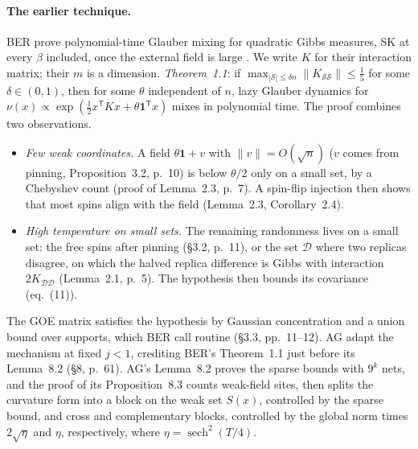 \documentclass[11pt]{article}
\newcommand{\one}{\mathbf{1}}
\newcommand{\norm}[1]{\lVert #1\rVert}
\newcommand{\ploc}[2]{#1}
\newcommand{\sloc}[2]{\cite[#2]{#1}}
\begin{document}
\paragraph{The earlier technique.}
BER prove polynomial-time Glauber mixing for quadratic Gibbs measures, SK at
every $\beta$ included, once the external field is large
\sloc{BandeiraElAlaouiRodder2026-GlauberHighOverlapGibbs}{\S1.1, Thm.~1.1 and Cor.~1.2, p.~3}.
We write $K$ for their interaction matrix; their $m$ is a dimension.
\emph{Theorem~1.1}: if
$\max_{|\mathcal S|\le\delta n}\norm{K_{\mathcal S\mathcal S}}\le\frac15$
for some $\delta\in(0,1)$, then for some $\theta$ independent of $n$, lazy
Glauber dynamics for
$\nu(x)\propto\exp(\frac12x^{\mathsf T}Kx+\theta\one^{\mathsf T}x)$ mixes in
polynomial time. The proof combines two observations.
\begin{itemize}
\item \emph{Few weak coordinates.} A field $\theta\one+v$ with
 $\norm v=O(\sqrt n)$ ($v$ comes from pinning, Proposition~3.2, p.~10) is
 below $\theta/2$ only on a small set, by a Chebyshev count (proof of
 Lemma~2.3, p.~7). A spin-flip injection then shows that most spins align
 with the field (Lemma~2.3, Corollary~2.4).
\item \emph{High temperature on small sets.} The remaining randomness lives
 on a small set: the free spins after pinning (\S3.2, p.~11), or the set
 $\mathcal D$ where two replicas disagree, on which the halved replica
 difference is Gibbs with interaction $2K_{\mathcal D\mathcal D}$
 (Lemma~2.1, p.~5). The hypothesis then bounds its covariance (eq.~(11)).
\end{itemize}
The GOE matrix satisfies the hypothesis by Gaussian concentration and a union
bound over supports, which BER call routine (\S3.3, pp.~11--12). AG adapt the
mechanism at fixed $j<1$, crediting BER's Theorem~1.1 just before its
Lemma~8.2 \ploc{(\S8, p.~61)}{terminal.tex:217--223}. AG's
\ploc{Lemma~8.2}{terminal.tex:225--327} proves the sparse bounds with $9^k$
nets, and the proof of its \ploc{Proposition~8.3}{terminal.tex:334--433}
counts weak-field sites, then splits the curvature form into a block on the
weak set $S(x)$, controlled by the sparse bound, and cross and complementary
blocks, controlled by the global norm times $2\sqrt\eta$ and $\eta$,
respectively, where $\eta=\operatorname{sech}^2(T/4)$.
\end{document}
